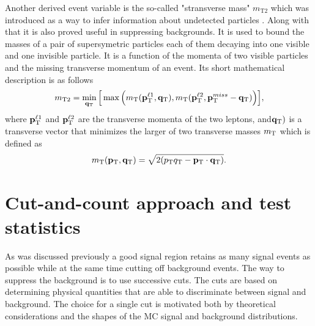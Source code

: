 Another derived event variable is the so-called "stransverse mass"  $m_{\text {T2}}$ which was introduced as a way to infer information about undetected particles \citep{Lester:1999tx,Barr:2003rg}. Along with that it is also proved useful in suppressing backgrounds. It is used to bound the masses of a pair of supersymetric particles each of them decaying into one visible and one invisible particle. It is a function of the momenta of two visible particles and the missing transverse momentum of an event. Its short mathematical description is as follows
\begin{equation}
m_{\text{T2}} = \min_{\mathbf{q}_{\text T}}\Big [\max \Big ( m_{\text T} (\mathbf{p}_{\text T}^{\ell 1},\mathbf{q}_{\text T}),m_{\text T}(\mathbf{p}_{\text T}^{\ell 2},\mathbf{p}_{\text T}^{miss}-\mathbf{q}_{\text T}) \Big ) \Big ] ,
\end{equation}
where $\mathbf{p}_{\text T}^{\ell 1}$ and $\mathbf{p}_{\text T}^{\ell 2}$ are the transverse momenta of the two leptons, and$ \mathbf{q}_{\text T})$ is a transverse vector that minimizes the larger of two transverse masses $m_{\text T}$ which is defined as
\begin{equation}
m_{\text T}(\mathbf{p}_{\text T},\mathbf{q}_{\text T}) = \sqrt{2(p_{\text T}q_{\text T} - \mathbf{p}_{\text T} \cdot \mathbf{q}_{\text T})}.
\end{equation}


\section{Cut-and-count approach and test statistics}
\label{subsec:stat}
As was discussed previously a good signal region retains as many signal events as possible while at the same time cutting off background events. The way to suppress the background is to use successive cuts. The cuts are based on determining physical quantities that are able to discriminate between signal and background. The choice for a single cut is motivated both by theoretical considerations and the shapes of the MC   signal and background distributions. 

